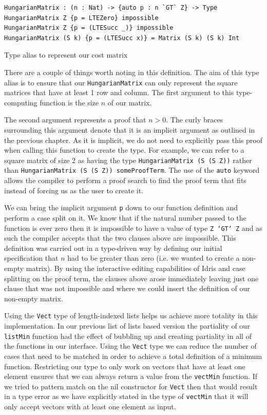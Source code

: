 \documentclass[a4paper, notitlepage]{report}
\begin{document}
\begin{listing}[H]
\begin{verbatim}
HungarianMatrix : (n : Nat) -> {auto p : n `GT` Z} -> Type
HungarianMatrix Z {p = LTEZero} impossible
HungarianMatrix Z {p = (LTESucc _)} impossible
HungarianMatrix (S k) {p = (LTESucc x)} = Matrix (S k) (S k) Int
\end{verbatim}
\caption{Type alias to represent our cost matrix}
\end{listing}

There are a couple of things worth noting in this definition. The aim of this
type alias is to ensure that our \texttt{HungarianMatrix} can only represent the square
matrices that have at least 1 row and column. The first argument to this
type-computing function is the size \(n\) of our matrix.

The second argument represents a proof that \(n > 0\). The curly braces
surrounding this argument denote that it is an implicit argument as outlined in
the previous chapter. As it is implicit, we do not need to explicitly pass this
proof when calling this function to create the type. For example, we can refer
to a square matrix of size 2 as having the type \texttt{HungarianMatrix (S (S Z))}
rather than \texttt{HungarianMatrix (S (S Z)) someProofTerm}. The use of the \texttt{auto}
keyword allows the compiler to perform a proof search to find the proof term
that fits instead of forcing us as the user to create it.

We can bring the implicit argument \texttt{p} down to our function definition and perform
a case split on it. We know that if the natural number passed to the function is
ever zero then it is impossible to have a value of type \texttt{Z `GT` Z} and as such the
compiler accepts that the two clauses above are impossible. This definition was
carried out in a type-driven way by defining our initial specification that \(n\)
had to be greater than zero (i.e. we wanted to create a non-empty matrix). By
using the interactive editing capabilities of Idris and case splitting on the
proof term, the clauses above arose immediately leaving just one clause that was
not impossible and where we could insert the definition of our non-empty matrix.

Using the \texttt{Vect} type of length-indexed lists helps us achieve more totality in
this implementation. In our previous list of lists based version the partiality
of our \texttt{listMin} function had the effect of bubbling up and creating partiality in
all of the functions in our interface. Using the \texttt{Vect} type we can reduce the
number of cases that need to be matched in order to achieve a total definition
of a minimum function. Restricting our type to only work on vectors that have at
least one element ensures that we can always return a value from the \texttt{vectMin}
function. If we tried to pattern match on the nil constructor for \texttt{Vect} then that
would result in a type error as we have explicitly stated in the type of \texttt{vectMin}
that it will only accept vectors with at least one element as input.
\end{document}
